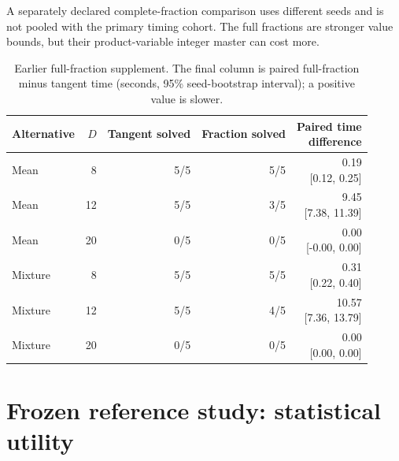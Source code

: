 \documentclass[11pt,a4paper]{article}
\begin{document}
A separately declared complete-fraction comparison uses different seeds and is not pooled with the primary timing cohort. The full fractions are stronger value bounds, but their product-variable integer master can cost more.
\begin{table}[tbp]\centering\small\setlength{\tabcolsep}{3.5pt}
\caption{Earlier full-fraction supplement. The final column is paired full-fraction minus tangent time (seconds, 95\% seed-bootstrap interval); a positive value is slower.}\label{tab:reference-ratio}
\begin{tabularx}{\linewidth}{@{}p{24mm}rrrr@{}}
\toprule Alternative & $D$ & Tangent solved & Fraction solved & \shortstack{Paired time\\difference} \\
\midrule
Mean & 8 & 5/5 & 5/5 & \shortstack{0.19\\{[0.12, 0.25]}} \\
Mean & 12 & 5/5 & 3/5 & \shortstack{9.45\\{[7.38, 11.39]}} \\
Mean & 20 & 0/5 & 0/5 & \shortstack{0.00\\{[-0.00, 0.00]}} \\
Mixture & 8 & 5/5 & 5/5 & \shortstack{0.31\\{[0.22, 0.40]}} \\
Mixture & 12 & 5/5 & 4/5 & \shortstack{10.57\\{[7.36, 13.79]}} \\
Mixture & 20 & 0/5 & 0/5 & \shortstack{0.00\\{[0.00, 0.00]}} \\
\bottomrule\end{tabularx}\end{table}


\FloatBarrier
\section{Frozen reference study: statistical utility}\label{sec:statistics}
\end{document}
